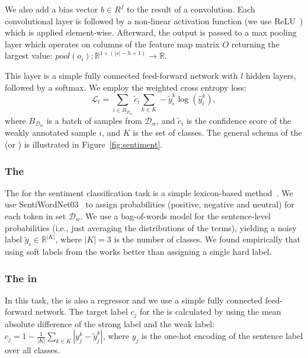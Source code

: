 We also add a bias vector $b \in R^f$ to the result of a convolution.
Each convolutional layer is followed by a non-linear activation function (we use ReLU~\citep{Nair:2010}) which is applied element-wise. Afterward, the output is passed to a max pooling layer which operates on columns of the feature map matrix $O$ returning the largest value: $pool(o_i) : \mathbb{R}^{1\times(|s|-h+1)} \rightarrow \mathbb{R}$.

This layer is a simple fully connected feed-forward network with $l$ hidden layers, followed by a softmax.  We employ the weighted cross entropy loss:
\begin{equation}
\mathcal{L}_t = \sum_{i\in B_{\mathcal{D}_w}} \tilde{c}_i \sum_{k \in K} - \tilde{y}_i^k \log (\hat{y}_i^k),
\end{equation}
where $B_{\mathcal{D}_w}$ is a batch of samples from $\mathcal{D}_w$, and $\tilde{c}_i$ is the confidence score of the weakly annotated sample $i$, and $K$ is the set of classes. 
The general schema of the \tnet (or \std) is illustrated in Figure~\ref{fig:sentiment}.

\subsubsection{The \wa}
\label{sentiment-WA}
The \wa for the sentiment classification task is a simple lexicon-based method~\citep{Hamdan:2013,Kiritchenko:2014}.
We use SentiWordNet03~\citep{Gaccianella:2010} to assign probabilities (positive, negative and neutral) for each token in set $\mathcal{D}_w$. We use a bag-of-words model for the sentence-level probabilities (i.e., just averaging the distributions of the terms), yielding a noisy label $\tilde{y}_i \in \mathbb{R}^{|K|}$, where $|K|=3$ is the number of classes.  We found empirically that using soft labels from the \wa works better than assigning a single hard label.


\subsubsection{The \cnet in \cws}
In this task, the \cnet is also a regressor and we use a simple fully connected feed-forward network. The target label $c_j$ for the \cnet is calculated by using the mean absolute difference of the strong label and the weak label: $c_j= 1-\frac{1}{|K|}\sum_{k\in K}|y_j^k - \tilde{y}_j^k|$, where $y_j$ is the one-hot encoding of the sentence label over all classes.


